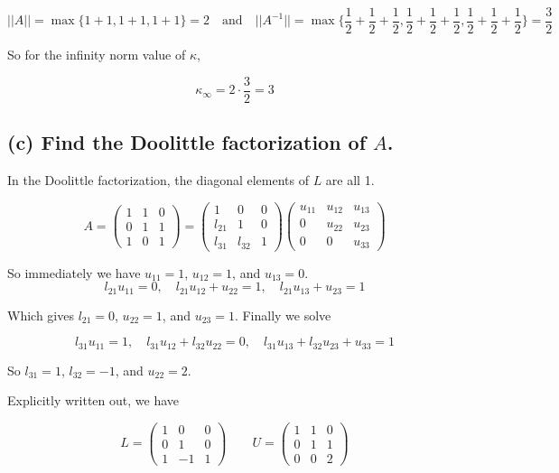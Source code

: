\documentclass{article}
\begin{document}
$$||A|| = \max\{1 + 1, 1 + 1, 1 + 1\} = 2 \quad \text{and} \quad ||A^{-1}|| = \max\{\frac{1}{2} + \frac{1}{2} + \frac{1}{2},\frac{1}{2} + \frac{1}{2} + \frac{1}{2},\frac{1}{2} + \frac{1}{2} + \frac{1}{2}\} = \frac{3}{2}$$

So for the infinity norm value of $\kappa$,

$$\kappa_{\infty} = 2 \cdot \frac{3}{2} = 3$$



\subsection*{(c) \normalsize Find the Doolittle factorization of $A$.}

In the Doolittle factorization, the diagonal elements of $L$ are all 1.

\[
A =
\begin{pmatrix}
  1 & 1 & 0 \\ 0 & 1 & 1 \\ 1 & 0 & 1
\end{pmatrix}
=
\begin{pmatrix}
  1 & 0 & 0 \\ l_{21} & 1 & 0 \\ l_{31} & l_{32} & 1
\end{pmatrix}
\begin{pmatrix}
  u_{11} & u_{12} & u_{13} \\ 0 & u_{22} & u_{23} \\ 0 & 0 & u_{33}
\end{pmatrix}
\]

So immediately we have $u_{11} = 1$, $u_{12} = 1$, and $u_{13} = 0$. $$l_{21}u_{11} = 0, \quad l_{21}u_{12} + u_{22} = 1, \quad l_{21}u_{13} + u_{23} = 1$$

Which gives $l_{21} = 0$, $u_{22} = 1$, and $u_{23} = 1$. Finally we solve

$$l_{31}u_{11} = 1, \quad l_{31}u_{12} + l_{32}u_{22} = 0, \quad l_{31}u_{13} + l_{32}u_{23} + u_{33} = 1$$

So $l_{31} = 1$, $l_{32} = -1$, and $u_{22} = 2$.

Explicitly written out, we have

\[
  L = 
  \begin{pmatrix}
    1 & 0 & 0 \\ 0 & 1 & 0 \\ 1 & -1 & 1
  \end{pmatrix}
  \qquad
  U =
  \begin{pmatrix}
    1 & 1 & 0 \\ 0 & 1 & 1 \\ 0 & 0 & 2
  \end{pmatrix}
\]
\end{document}
